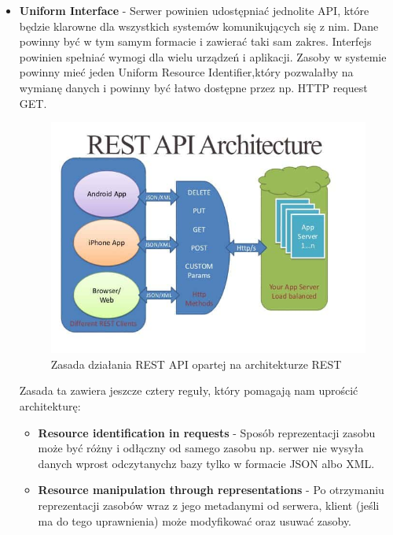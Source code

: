 \documentclass[oneside,polski,logo,indent]{amuthesis}
\begin{document}
\begin{itemize}
\item \textbf{Uniform Interface} - Serwer powinien udostępniać jednolite API, które będzie klarowne dla wszystkich systemów komunikujących się z nim. Dane powinny być w tym samym formacie i zawierać taki sam zakres. Interfejs powinien spełniać wymogi dla wielu urządzeń i aplikacji. Zasoby w systemie powinny mieć jeden Uniform Resource Identifier,\break który pozwalałby na wymianę danych i powinny być łatwo dostępne przez np. HTTP request GET.

\begin{figure}[H]
\centering
\includegraphics[width=14cm]{restarch.jpg}
\caption{Zasada działania REST API opartej na architekturze REST}
\label{REST API}
\end{figure}

Zasada ta zawiera jeszcze cztery reguły, który pomagają nam uprościć architekturę: 
\begin{itemize}
\item \textbf{Resource identification in requests} - Sposób reprezentacji zasobu może być różny i odłączny od samego zasobu np. serwer nie wysyła danych wprost odczytanych\break z bazy tylko w formacie JSON albo XML.\newline  

\item \textbf{Resource manipulation through representations}  - Po otrzymaniu reprezentacji zasobów wraz z jego metadanymi od serwera, klient (jeśli ma do tego uprawnienia) może modyfikować oraz usuwać zasoby.\newline  


\end{itemize}
\end{itemize}
\end{document}
